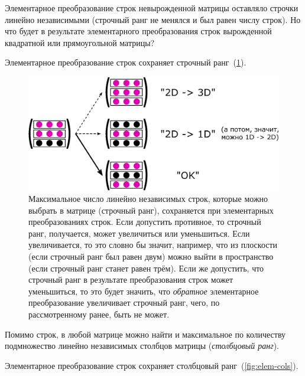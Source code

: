\documentclass[a4paper,12pt]{article}
\begin{document}
    Элементарное преобразование строк невырожденной матрицы оставляло строчки линейно независимыми (строчный ранг не менялся и был равен числу строк).
    Но что будет в результате элементарного преобразования строк вырожденной квадратной или прямоугольной матрицы?
    
    \begin{proposition}
      Элементарное преобразование строк сохраняет строчный ранг~(\ref{fig:elem-rows}).
    \end{proposition}
    
    \begin{figure}[h]
      \centering
    
      \includegraphics[width=0.8\columnwidth]{elem-rows}
    
      \caption{Максимальное число линейно независимых строк, которые можно выбрать в матрице (строчный ранг), сохраняется при элементарных преобразованиях строк. Если допустить противное, то строчный ранг, получается, может увеличиться или уменьшиться. Если увеличивается, то это словно бы значит, например, что из плоскости (если строчный ранг был равен двум) можно выйти в пространство (если строчный ранг станет равен трём). Если же допустить, что строчный ранг в результате преобразования строк может уменьшиться, то это будет значить, что \emph{обратное} элементарное преобразование увеличивает строчный ранг, чего, по рассмотренному ранее, быть не может.}
      \label{fig:elem-rows}
    \end{figure}
    
    Помимо строк, в любой матрице можно найти и максимальное по количеству подмножество линейно независимых столбцов матрицы (\emph{столбцовый ранг}).
    
    \begin{proposition}
      Элементарное преобразование строк сохраняет столбцовый ранг~(\ref{fig:elem-cols}).
    \end{proposition}
    
\end{document}
